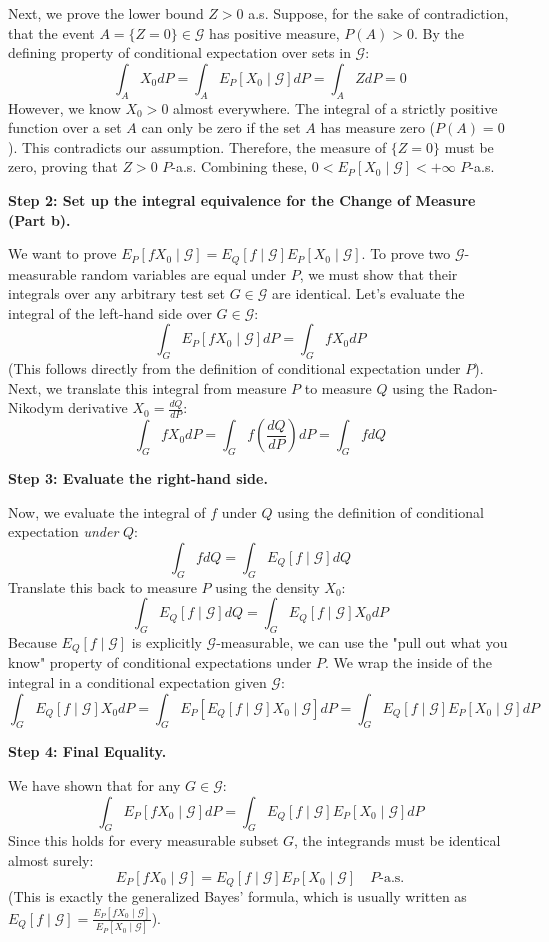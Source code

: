 \begin{solution}
Next, we prove the lower bound $Z > 0$ a.s.
Suppose, for the sake of contradiction, that the event $A = \{Z = 0\} \in \mathcal{G}$ has positive measure, $P(A) > 0$.
By the defining property of conditional expectation over sets in $\mathcal{G}$:
\[ \int_A X_0 dP = \int_A E_P[X_0 \mid \mathcal{G}] dP = \int_A Z dP = 0 \]
However, we know $X_0 > 0$ almost everywhere. The integral of a strictly positive function over a set $A$ can only be zero if the set $A$ has measure zero ($P(A) = 0$). This contradicts our assumption.
Therefore, the measure of $\{Z = 0\}$ must be zero, proving that $Z > 0$ $P$-a.s.
Combining these, $0 < E_P[X_0 \mid \mathcal{G}] < +\infty$ $P$-a.s.

\textbf{Step 2: Set up the integral equivalence for the Change of Measure (Part b).}

We want to prove $E_P[fX_0 \mid \mathcal{G}] = E_Q[f \mid \mathcal{G}] E_P[X_0 \mid \mathcal{G}]$.
To prove two $\mathcal{G}$-measurable random variables are equal under $P$, we must show that their integrals over any arbitrary test set $G \in \mathcal{G}$ are identical.
Let's evaluate the integral of the left-hand side over $G \in \mathcal{G}$:
\[ \int_G E_P[fX_0 \mid \mathcal{G}] dP = \int_G fX_0 dP \]
(This follows directly from the definition of conditional expectation under $P$).
Next, we translate this integral from measure $P$ to measure $Q$ using the Radon-Nikodym derivative $X_0 = \frac{dQ}{dP}$:
\[ \int_G fX_0 dP = \int_G f \left(\frac{dQ}{dP}\right) dP = \int_G f dQ \]

\textbf{Step 3: Evaluate the right-hand side.}

Now, we evaluate the integral of $f$ under $Q$ using the definition of conditional expectation \textit{under} $Q$:
\[ \int_G f dQ = \int_G E_Q[f \mid \mathcal{G}] dQ \]
Translate this back to measure $P$ using the density $X_0$:
\[ \int_G E_Q[f \mid \mathcal{G}] dQ = \int_G E_Q[f \mid \mathcal{G}] X_0 dP \]
Because $E_Q[f \mid \mathcal{G}]$ is explicitly $\mathcal{G}$-measurable, we can use the "pull out what you know" property of conditional expectations under $P$. We wrap the inside of the integral in a conditional expectation given $\mathcal{G}$:
\[ \int_G E_Q[f \mid \mathcal{G}] X_0 dP = \int_G E_P[ E_Q[f \mid \mathcal{G}] X_0 \mid \mathcal{G} ] dP = \int_G E_Q[f \mid \mathcal{G}] E_P[X_0 \mid \mathcal{G}] dP \]

\textbf{Step 4: Final Equality.}

We have shown that for any $G \in \mathcal{G}$:
\[ \int_G E_P[fX_0 \mid \mathcal{G}] dP = \int_G E_Q[f \mid \mathcal{G}] E_P[X_0 \mid \mathcal{G}] dP \]
Since this holds for every measurable subset $G$, the integrands must be identical almost surely:
\[ E_P[fX_0 \mid \mathcal{G}] = E_Q[f \mid \mathcal{G}] E_P[X_0 \mid \mathcal{G}] \quad P\text{-a.s.} \]
(This is exactly the generalized Bayes' formula, which is usually written as $E_Q[f \mid \mathcal{G}] = \frac{E_P[fX_0 \mid \mathcal{G}]}{E_P[X_0 \mid \mathcal{G}]}$).
\end{solution}

